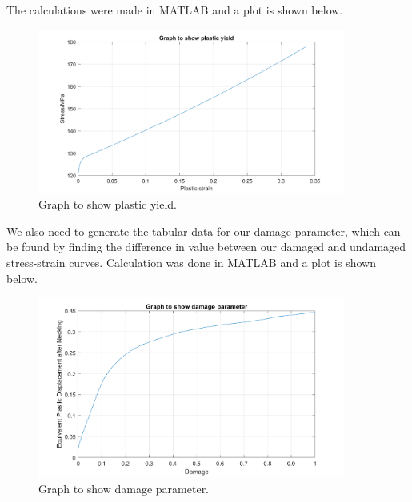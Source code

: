 \documentclass[11pt]{article}
\numberwithin{equation}{section}
\begin{document}
The calculations were made in MATLAB and a plot is shown below. 
\begin{figure}[H]
    \centering
    \includegraphics[width = 0.9\textwidth]{./img/plasticYield.png}
    \caption{Graph to show plastic yield.}
\end{figure}
We also need to generate the tabular data for our damage parameter, which can be found by finding the difference in value between our damaged and undamaged stress-strain curves. Calculation was done in MATLAB and a plot is shown below.
\begin{figure}[H]
    \centering
    \includegraphics[width = 0.9\textwidth]{./img/damage.png}
    \caption{Graph to show damage parameter.}
\end{figure}
\end{document}
